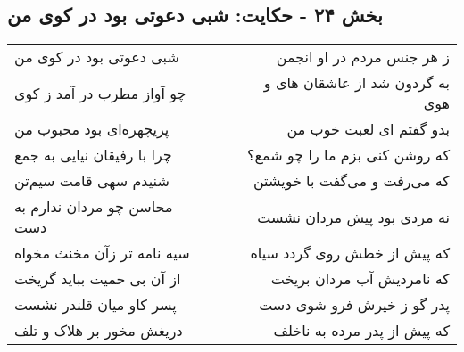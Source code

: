 \begin{center}
\section*{بخش ۲۴ - حکایت: شبی دعوتی بود در کوی من}
\label{sec:024}
\begin{longtable}{l p{0.5cm} r}
شبی دعوتی بود در کوی من
&&
ز هر جنس مردم در او انجمن
\\
چو آواز مطرب در آمد ز کوی
&&
به گردون شد از عاشقان های و هوی
\\
پریچهره‌ای بود محبوب من
&&
بدو گفتم ای لعبت خوب من
\\
چرا با رفیقان نیایی به جمع
&&
که روشن کنی بزم ما را چو شمع؟
\\
شنیدم سهی قامت سیم‌تن
&&
که می‌رفت و می‌گفت با خویشتن
\\
محاسن چو مردان ندارم به دست
&&
نه مردی بود پیش مردان نشست
\\
سیه نامه تر زآن مخنث مخواه
&&
که پیش از خطش روی گردد سیاه
\\
از آن بی حمیت بباید گریخت
&&
که نامردیش آب مردان بریخت
\\
پسر کاو میان قلندر نشست
&&
پدر گو ز خیرش فرو شوی دست
\\
دریغش مخور بر هلاک و تلف
&&
که پیش از پدر مرده به ناخلف
\\
\end{longtable}
\end{center}

